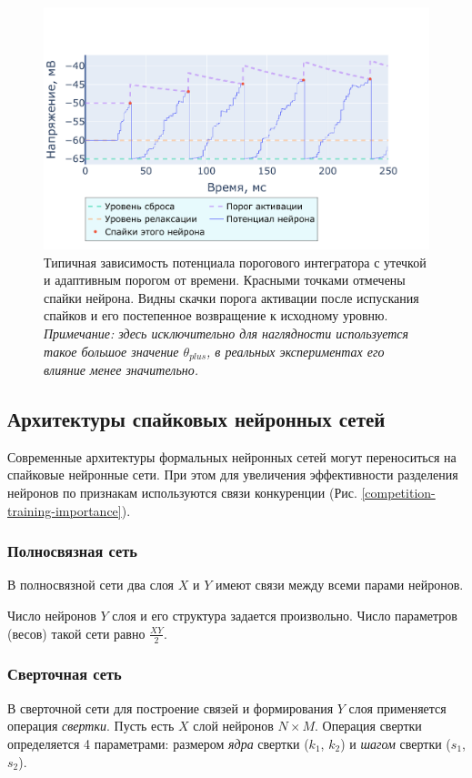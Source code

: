 \documentclass[a4paper]{article}
\begin{document}
\begin{center}
\begin{figure}[H]
 \includegraphics[width=\textwidth,keepaspectratio=true]{model_alif_ru.pdf}
 \caption{Типичная зависимость потенциала порогового интегратора с утечкой и адаптивным порогом от времени. Красными точками отмечены спайки нейрона. Видны скачки порога активации после испускания спайков и его постепенное возвращение к исходному уровню.\\
 \textit{Примечание: здесь исключительно для наглядности используется такое большое значение $\theta_{plus}$, в реальных экспериментах его влияние менее значительно.}}
\end{figure} 
\end{center}

\subsection{Архитектуры спайковых нейронных сетей} \label{sec:architectures}
Современные архитектуры формальных нейронных сетей могут переноситься на спайковые нейронные сети. При этом для увеличения эффективности разделения нейронов по признакам используются связи конкуренции (Рис. \ref{competition-training-importance}). 

\subsubsection{Полносвязная сеть}
В полносвязной сети два слоя $X$ и $Y$ имеют связи между всеми парами нейронов.

Число нейронов $Y$ слоя и его структура задается произвольно. Число параметров (весов) такой сети равно $\frac{XY}{2}$.

\subsubsection{Сверточная сеть}
В сверточной сети для построение связей и формирования $Y$ слоя применяется операция \textit{свертки}. Пусть есть $X$ слой нейронов $N \times M$. Операция свертки определяется 4 параметрами: размером \textit{ядра} свертки ($k_1$, $k_2$) и \textit{шагом} свертки ($s_1$, $s_2$).
\end{document}
